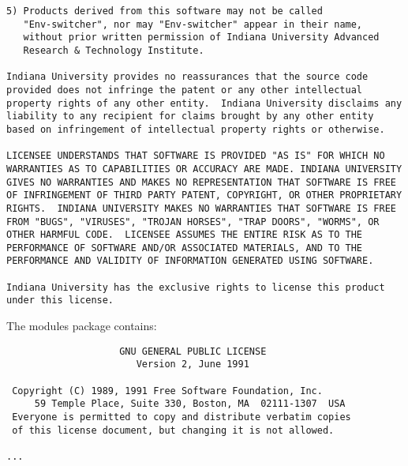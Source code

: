 \begin{verbatim}
5) Products derived from this software may not be called
   "Env-switcher", nor may "Env-switcher" appear in their name,
   without prior written permission of Indiana University Advanced
   Research & Technology Institute.

Indiana University provides no reassurances that the source code
provided does not infringe the patent or any other intellectual
property rights of any other entity.  Indiana University disclaims any
liability to any recipient for claims brought by any other entity
based on infringement of intellectual property rights or otherwise.

LICENSEE UNDERSTANDS THAT SOFTWARE IS PROVIDED "AS IS" FOR WHICH NO
WARRANTIES AS TO CAPABILITIES OR ACCURACY ARE MADE. INDIANA UNIVERSITY
GIVES NO WARRANTIES AND MAKES NO REPRESENTATION THAT SOFTWARE IS FREE
OF INFRINGEMENT OF THIRD PARTY PATENT, COPYRIGHT, OR OTHER PROPRIETARY
RIGHTS.  INDIANA UNIVERSITY MAKES NO WARRANTIES THAT SOFTWARE IS FREE
FROM "BUGS", "VIRUSES", "TROJAN HORSES", "TRAP DOORS", "WORMS", OR
OTHER HARMFUL CODE.  LICENSEE ASSUMES THE ENTIRE RISK AS TO THE
PERFORMANCE OF SOFTWARE AND/OR ASSOCIATED MATERIALS, AND TO THE
PERFORMANCE AND VALIDITY OF INFORMATION GENERATED USING SOFTWARE.

Indiana University has the exclusive rights to license this product
under this license.
\end{verbatim}

The modules package contains:

\begin{verbatim}
                    GNU GENERAL PUBLIC LICENSE
                       Version 2, June 1991

 Copyright (C) 1989, 1991 Free Software Foundation, Inc.
     59 Temple Place, Suite 330, Boston, MA  02111-1307  USA
 Everyone is permitted to copy and distribute verbatim copies
 of this license document, but changing it is not allowed.

...
\end{verbatim}

